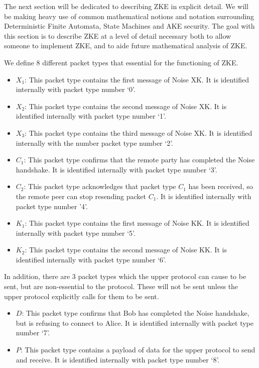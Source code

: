 \documentclass{article}
\begin{document}
The next section will be dedicated to describing ZKE in explicit detail. We will be making heavy use of common mathematical notions and notation surrounding Deterministic Finite Automata, State Machines and AKE security. The goal with this section is to describe ZKE at a level of detail necessary both to allow someone to implement ZKE, and to aide future mathematical analysis of ZKE.

\begin{definition}
	We define 8 different packet types that essential for the functioning of ZKE.
	\begin{itemize}
		\item $X_1$: This packet type contains the first message of Noise XK. It is identified internally with packet type number `0'.
		\item $X_2$: This packet type contains the second message of Noise XK. It is identified internally with packet type number `1'.
		\item $X_3$: This packet type contains the third message of Noise XK. It is identified internally with the number packet type number `2'.
		\item $C_1$: This packet type confirms that the remote party has completed the Noise handshake. It is identified internally with packet type number `3'.
		\item $C_2$: This packet type acknowledges that packet type $C_1$ has been received, so the remote peer can stop resending packet $C_1$. It is identified internally with packet type number '4'.
		\item $K_1$: This packet type contains the first message of Noise KK. It is identified internally with packet type number `5'.
		\item $K_2$: This packet type contains the second message of Noise KK. It is identified internally with packet type number `6'.
	\end{itemize}
	In addition, there are 3 packet types which the upper protocol can cause to be sent, but are non-essential to the protocol. These will not be sent unless the upper protocol explicitly calls for them to be sent.
	\begin{itemize}
		\item $D$: This packet type confirms that Bob has completed the Noise handshake, but is refusing to connect to Alice. It is identified internally with packet type number `7'.
		\item $P$: This packet type contains a payload of data for the upper protocol to send and receive. It is identified internally with packet type number `8'.
	\end{itemize}
\end{definition}
\end{document}
